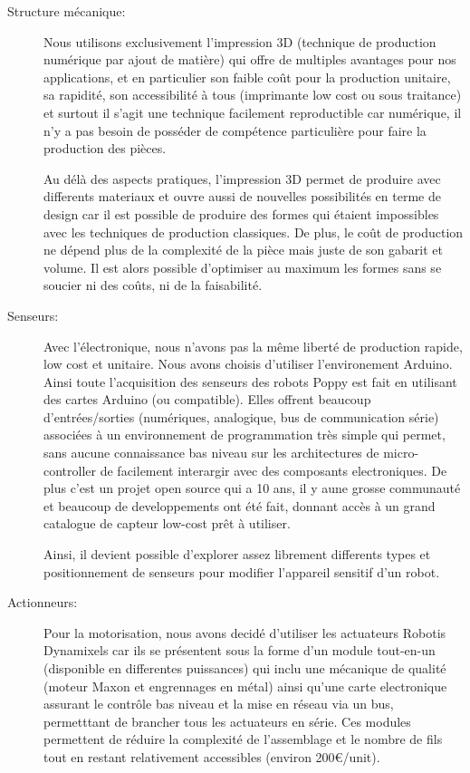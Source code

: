 \begin{description}
  \item[Structure mécanique:] Nous utilisons exclusivement l'impression 3D (technique de production numérique par ajout de matière) qui offre de multiples avantages pour nos applications, et en particulier son faible coût pour la production unitaire, sa rapidité, son accessibilité à tous (imprimante low cost ou sous traitance) et surtout il s'agit une technique facilement reproductible car numérique, il n'y a pas besoin de posséder de compétence particulière pour faire la production des pièces. 

  Au délà des aspects pratiques, l'impression 3D permet de produire avec differents materiaux et ouvre aussi de nouvelles possibilités en terme de design car il est possible de produire des formes qui étaient impossibles avec les techniques de production classiques. De plus, le coût de production ne dépend plus de la complexité de la pièce mais juste de son gabarit et volume. 
  Il est alors possible d'optimiser au maximum les formes sans se soucier ni des coûts, ni de la faisabilité.

  \item[Senseurs:] Avec l'électronique, nous n'avons pas la même liberté de production rapide, low cost et unitaire. Nous avons choisis d'utiliser l'environement Arduino. Ainsi toute l'acquisition des senseurs des robots Poppy est fait en utilisant des cartes Arduino (ou compatible). Elles offrent beaucoup d'entrées/sorties (numériques, analogique, bus de communication série) associées à un environnement de programmation très simple qui permet, sans aucune connaissance bas niveau sur les architectures de micro-controller de facilement interargir avec des composants electroniques.
  De plus c'est un projet open source qui a 10 ans, il y aune grosse communauté et beaucoup de developpements ont été fait, donnant accès à un grand catalogue de capteur low-cost prêt à utiliser.

  Ainsi, il devient possible d'explorer assez librement differents types et positionnement de senseurs pour modifier l'appareil sensitif d'un robot.

  \item[Actionneurs:] Pour la motorisation, nous avons decidé d'utiliser les actuateurs Robotis Dynamixels car ils se présentent sous la forme d'un module tout-en-un (disponible en differentes puissances) qui inclu une mécanique de qualité (moteur Maxon et engrennages en métal) ainsi qu'une carte electronique assurant le contrôle bas niveau et la mise en réseau via un bus, permetttant de brancher tous les actuateurs en série. Ces modules permettent de réduire la complexité de l'assemblage et le nombre de fils tout en restant relativement accessibles (environ 200€/unit).


\end{description}
